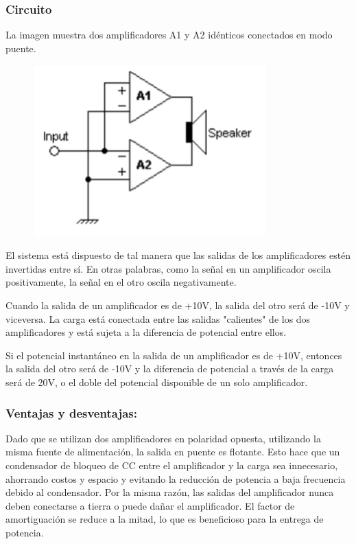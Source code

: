 \documentclass[../main.tex]{subfiles}
\begin{document}
		\subsubsection{Circuito}
		La imagen muestra dos amplificadores A1 y A2 idénticos conectados en modo puente.

		\begin{figure}[H]
			\includegraphics[width=0.8\textwidth]{imagen19.png}
			\centering
		\end{figure}

		El sistema está dispuesto de tal manera que las salidas de los 
		amplificadores estén invertidas entre sí. En otras palabras, como la señal 
		en un amplificador oscila positivamente, la señal en el otro oscila 
		negativamente.

		Cuando la salida de un amplificador es de +10V, la salida del 
		otro será de -10V y viceversa. La carga está conectada entre las salidas 
		"calientes" de los dos amplificadores y está sujeta a la diferencia de 
		potencial entre ellos. 
		
		Si el potencial instantáneo en la salida de un 
		amplificador es de +10V, entonces la salida del otro será de -10V y la 
		diferencia de potencial a través de la carga será de 20V, o el doble del 
		potencial disponible de un solo amplificador.

		\subsubsection{Ventajas y desventajas:}
		Dado que se utilizan dos amplificadores en polaridad opuesta, utilizando la misma 
		fuente de alimentación, la salida en puente es flotante. Esto hace que un 
		condensador de bloqueo de CC entre el amplificador y la carga sea innecesario, 
		ahorrando costos y espacio y evitando la reducción de potencia a baja frecuencia 
		debido al condensador.  Por la misma razón, las salidas del amplificador nunca 
		deben conectarse a tierra o puede dañar el amplificador. El factor de 
		amortiguación se reduce a la mitad, lo que es beneficioso para la entrega de potencia.
\end{document}
